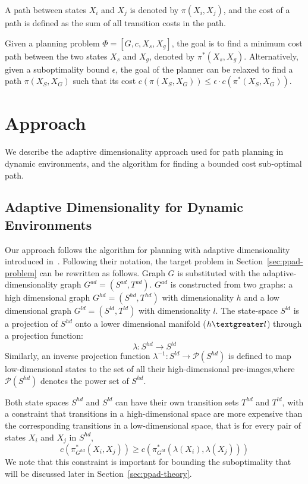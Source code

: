 A path between states $X_i$ and $X_j$ is denoted by $\pi(X_i,X_j)$, and the cost of a path is defined as the sum of all transition costs in the path. 

Given a planning problem $\Phi = [G, c, X_{s}, X_{g}]$, the goal is to find a minimum cost path between the two states $X_{s}$ and $X_{g}$, denoted by $\pi^*(X_s,X_g)$. 
Alternatively, given a suboptimality bound $\epsilon$, the goal of the planner can be relaxed to find a path $\pi(X_S,X_G)$ such that its cost $c(\pi(X_S,X_G)) \leq \epsilon \cdot c(\pi^*(X_S,X_G))$.

\section{Approach}\label{sec:ppad-approach}

We describe the adaptive dimensionality approach used for path planning in dynamic environments, and the algorithm for finding a bounded cost sub-optimal path.

\subsection{Adaptive Dimensionality for Dynamic Environments}
Our approach follows the algorithm for planning with adaptive dimensionality introduced in~\cite{gochev2011path}.
Following their notation, the target problem in Section~\ref{sec:ppad-problem} can be rewritten as follows.
Graph $G$ is substituted with the adaptive-dimensionality graph $G^{ad} = (S^{ad}, T^{ad})$. $G^{ad}$ is constructed from two graphs: a high dimensional graph $G^{hd} = (S^{hd}, T^{hd})$ with dimensionality $h$ and a low dimensional graph $G^{ld} = (S^{ld}, T^{ld})$ with dimensionality $l$. The state-space $S^{ld}$ is a projection of $S^{hd}$ onto a lower dimensional manifold ($ h \textgreater l$) through a projection function:
\begin{equation}
\lambda : S^{hd} \rightarrow S^{ld}
\end{equation}\label{eq:ppad-lambda}
Similarly, an inverse projection function $\lambda^{-1} : S^{ld} \rightarrow \mathcal{P}(S^{hd})$ is defined to map low-dimensional states to the set of all their high-dimensional pre-images,where $\mathcal{P}(S^{hd})$ denotes the power set of $S^{hd}$.

Both state spaces $S^{hd}$ and $S^{ld}$ can have their own transition sets $T^{hd}$ and $T^{ld}$,
with a constraint that transitions in a high-dimensional space are more expensive than the corresponding transitions in a low-dimensional space, that is for every pair of states $X_i$ and $X_j$ in $S^{hd}$,
\begin{equation}
c(\pi^*_{G^{hd}}(X_i,X_j)) \geq c(\pi^*_{G^{ld}}(\lambda(X_i), \lambda(X_j)))
\label{eq:ppad-cost}
\end{equation}
We note that this constraint is important for bounding the suboptimality that will be discussed later in Section~\ref{sec:ppad-theory}.



